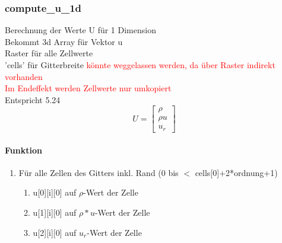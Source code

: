 \documentclass[12pt]{article}
\begin{document}
\subsubsection{compute\_u\_1d}
Berechnung der Werte U für 1 Dimension\\
Bekommt 3d Array für Vektor u\\
Raster für alle Zellwerte\\
'cells' für Gitterbreite \textcolor{red}{könnte weggelassen werden, da über Raster indirekt vorhanden\\
Im Endeffekt werden Zellwerte nur umkopiert}\\
Entspricht 5.24\\
\begin{equation}
U = \left[\begin{array}{c}\rho \\ \rho u \\ u_r\end{array}\right]
\end{equation}

\renewcommand{\labelenumi}{\alph{enumi})} 
\paragraph{Funktion}
\begin{enumerate}
	\item Für alle Zellen des Gitters inkl. Rand (0 bis $<$ cells[0]+2*ordnung+1)
	\begin{enumerate}
		\item u[0][i][0] auf $\rho$-Wert der Zelle
		\item u[1][i][0] auf $\rho * u$-Wert der Zelle
		\item u[2][i][0] auf $u_r$-Wert der Zelle
	\end{enumerate}
\end{enumerate}
\end{document}
